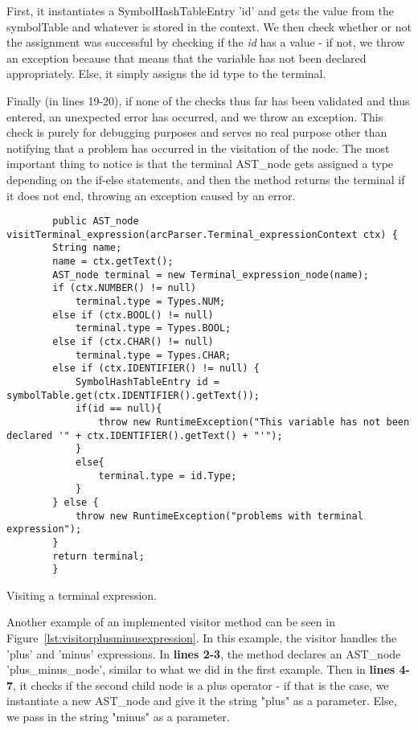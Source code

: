 First, it instantiates a SymbolHashTableEntry 'id' and gets the value from the symbolTable and whatever is stored in the context. We then check whether or not the assignment was successful by checking if the \textit{id} has a value - if not, we throw an exception because that means that the variable has not been declared appropriately. Else, it simply assigns the id type to the terminal.

Finally (in lines 19-20), if none of the checks thus far has been validated and thus entered, an unexpected error has occurred, and we throw an exception. This check is purely for debugging purposes and serves no real purpose other than notifying that a problem has occurred in the visitation of the node. The most important thing to notice is that the terminal AST\_node gets assigned a type depending on the if-else statements, and then the method returns the terminal if it does not end, throwing an exception caused by an error.


\begin{listing}[htb!]
    \begin{verbatim}
        public AST_node visitTerminal_expression(arcParser.Terminal_expressionContext ctx) {
        String name;
        name = ctx.getText();
        AST_node terminal = new Terminal_expression_node(name);
        if (ctx.NUMBER() != null)
            terminal.type = Types.NUM;
        else if (ctx.BOOL() != null)
            terminal.type = Types.BOOL;
        else if (ctx.CHAR() != null)
            terminal.type = Types.CHAR;
        else if (ctx.IDENTIFIER() != null) {
            SymbolHashTableEntry id = symbolTable.get(ctx.IDENTIFIER().getText());
            if(id == null){
                throw new RuntimeException("This variable has not been declared '" + ctx.IDENTIFIER().getText() + "'");
            }
            else{
                terminal.type = id.Type;
            }
        } else {
            throw new RuntimeException("problems with terminal expression");
        }
        return terminal;
        }
    \end{verbatim}
    \caption{Visiting a terminal expression.}
    \label{lst:visitorterminalexpression}
\end{listing}


Another example of an implemented visitor method can be seen in Figure~\ref{lst:visitorplusminusexpression}. In this example, the visitor handles the 'plus' and 'minus' expressions. In \textbf{lines 2-3}, the method declares an AST\_node 'plus\_minus\_node', similar to what we did in the first example. Then in \textbf{lines 4-7}, it checks if the second child node is a plus operator - if that is the case, we instantiate a new AST\_node and give it the string "plus" as a parameter. Else, we pass in the string "minus" as a parameter.

